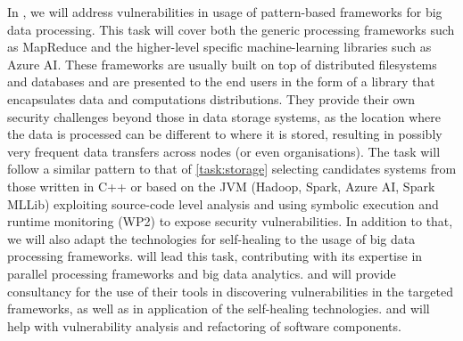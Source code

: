 \begin{Workpackage}{\thewpno}
 \begin{Task}
 \TaskResults{%
 \ref{del:bigdata1},
 \ref{del:bigdata2},
 \ref{del:bigdata3}
 }
 \TaskHeader{}
 In \theTask, we will address vulnerabilities in usage of pattern-based frameworks for big data processing. This task will cover both the generic processing frameworks such as MapReduce and the higher-level specific machine-learning libraries such as Azure AI. These frameworks are usually built on top of distributed filesystems and databases and are presented to the end users in the form of a library that encapsulates data and computations distributions. They provide their own security challenges beyond those in data storage systems, as the location where the data is processed can be different to where it is stored, resulting in possibly very frequent data transfers across nodes (or even organisations). The task will follow a similar pattern to that of \ref{task:storage} selecting candidates systems from those written in C++ or based on the JVM (Hadoop, Spark, Azure AI, Spark MLLib) exploiting source-code level analysis and using symbolic execution and runtime monitoring (WP2) to expose security vulnerabilities. In addition to that, we will also adapt the technologies for self-healing to the usage of big data processing frameworks. \UODshort{} will lead this task, contributing with its expertise in parallel processing frameworks and big data analytics. \IBMshort{} and \YAGshort{} will provide consultancy for the use of their tools in discovering vulnerabilities in the targeted frameworks, as well as in application of the self-healing technologies. \UCM and \SA will help with vulnerability analysis and refactoring of software components.

\end{Task}
 
\begin{Task}
  

\end{Task}
\end{Workpackage}
